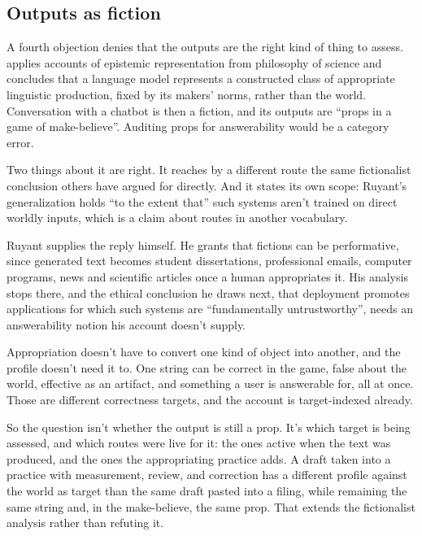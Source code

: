 \documentclass[12pt]{article}
\begin{document}
\subsection{Outputs as fiction}

A fourth objection denies that the outputs are the right kind of thing to assess.
\textcite{ruyant_2026_what_do_llms_represent} applies accounts of epistemic
representation from philosophy of science and concludes that a language model represents
a constructed class of appropriate linguistic production, fixed by its makers' norms,
rather than the world. Conversation with a chatbot is then a fiction, and its outputs are
\enquote{props in a game of make-believe}. Auditing props for answerability would be a
category error.

Two things about it are right. It reaches by a different route the same fictionalist
conclusion others have argued for directly. And it states its own scope: Ruyant's
generalization holds \enquote{to the extent that} such systems aren't trained on direct
worldly inputs, which is a claim about routes in another vocabulary.

Ruyant supplies the reply himself. He grants that fictions can be performative, since
generated text becomes student dissertations, professional emails, computer programs,
news and scientific articles once a human appropriates it. His analysis stops there,
and the ethical conclusion he draws next, that deployment promotes applications for which
such systems are \enquote{fundamentally untrustworthy}, needs an answerability notion his
account doesn't supply.

Appropriation doesn't have to convert one kind of object into another, and the profile
doesn't need it to. One string can be correct in the game, false about the world, effective
as an artifact, and something a user is answerable for, all at once. Those are different
correctness targets, and the account is target-indexed already.

So the question isn't whether the output is still a prop. It's which target is being
assessed, and which routes were live for it: the ones active when the text was produced,
and the ones the appropriating practice adds. A draft taken into a practice with
measurement, review, and correction has a different profile against the world as target
than the same draft pasted into a filing, while remaining the same string and, in the
make-believe, the same prop. That extends the fictionalist analysis rather than refuting
it.
\end{document}
